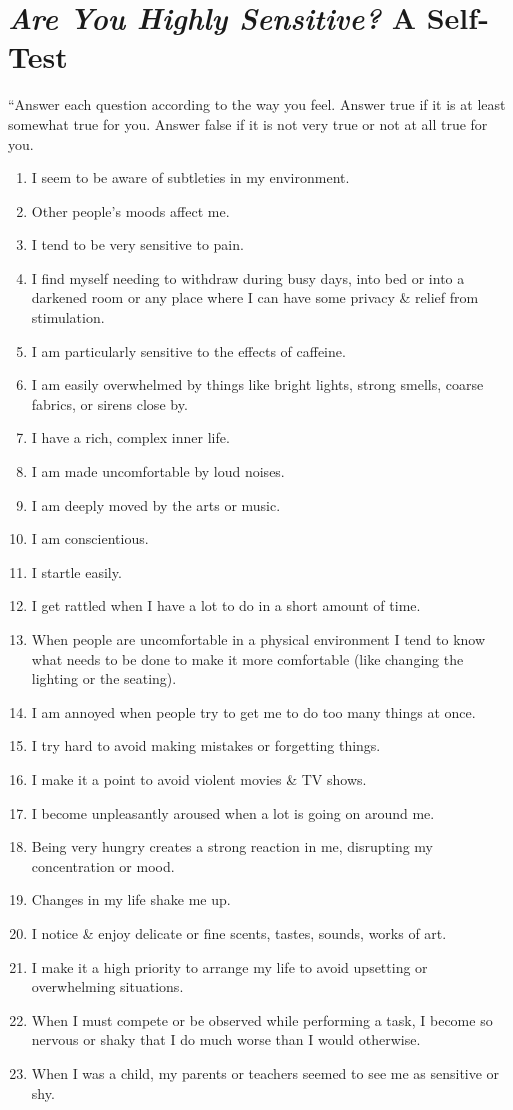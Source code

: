 \documentclass{article}
\numberwithin{equation}{section}
\begin{document}
\section*{\textit{Are You Highly Sensitive?} A Self-Test}
``Answer each question according to the way you feel. Answer true if it is at least somewhat true for you. Answer false if it is not very true or not at all true for you.
\begin{enumerate}
	\item I seem to be aware of subtleties in my environment.
	\item Other people's moods affect me.
	\item I tend to be very sensitive to pain.
	\item I find myself needing to withdraw during busy days, into bed or into a darkened room or any place where I can have some privacy \& relief from stimulation.
	\item I am particularly sensitive to the effects of caffeine.
	\item I am easily overwhelmed by things like bright lights, strong smells, coarse fabrics, or sirens close by.
	\item I have a rich, complex inner life.
	\item I am made uncomfortable by loud noises.
	\item I am deeply moved by the arts or music.
	\item I am conscientious.
	\item I startle easily.
	\item I get rattled when I have a lot to do in a short amount of time.
	\item When people are uncomfortable in a physical environment I tend to know what needs to be done to make it more comfortable (like changing the lighting or the seating).
	\item I am annoyed when people try to get me to do too many things at once.
	\item I try hard to avoid making mistakes or forgetting things.
	\item I make it a point to avoid violent movies \& TV shows.
	\item I become unpleasantly aroused when a lot is going on around me.
	\item Being very hungry creates a strong reaction in me, disrupting my concentration or mood.
	\item Changes in my life shake me up.
	\item I notice \& enjoy delicate or fine scents, tastes, sounds, works of art.
	\item I make it a high priority to arrange my life to avoid upsetting or overwhelming situations.
	\item When I must compete or be observed while performing a task, I become so nervous or shaky that I do much worse than I would otherwise.
	\item When I was a child, my parents or teachers seemed to see me as sensitive or shy.
\end{enumerate}
\end{document}
